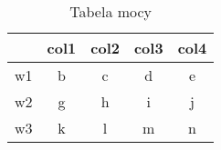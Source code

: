 \begin{table}[htbp]
\centering
\begin{tabular}{| c | c | c | c | c |}
    \hline
     & col1 & col2 & col3 & col4 \\
    \hline
    w1 & b    & c    & d    & e    \\
    w2 & g    & h    & i    & j    \\
    w3 & k    & l    & m    & n    \\
    \hline
\end{tabular}
\caption{Tabela mocy}
\label{tab:tabwojdud}
\end{table}

